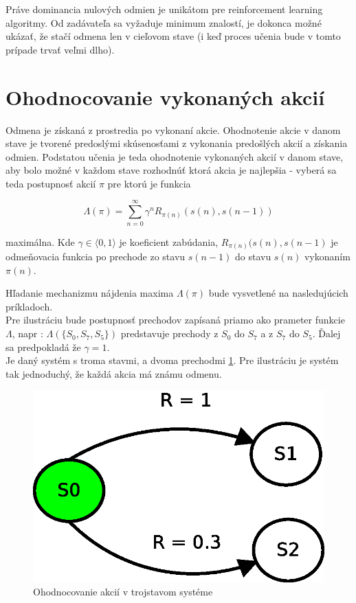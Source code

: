 Práve dominancia nulových odmien je unikátom pre reinforcement learning algoritmy.
Od zadávateľa sa vyžaduje minimum znalostí, je dokonca možné ukázať, že stačí
odmena len v cieľovom stave (i keď proces učenia bude v tomto prípade trvať veľmi dlho).


\section{Ohodnocovanie vykonaných akcií}

Odmena je získaná z prostredia po vykonaní akcie. Ohodnotenie akcie v danom stave
je tvorené predoslými skúsenosťami z vykonania predošlých akcií a získania odmien.
Podstatou učenia je teda ohodnotenie vykonaných akcií v danom stave, aby bolo
možné v každom stave rozhodnúť ktorá akcia je najlepšia - vyberá sa teda
postupnosť akcií $\pi$ pre ktorú je funkcia

\begin{equation}
\Lambda(\pi)  = \sum\limits_{n=0}^{\infty}\gamma^n R_{\pi(n)}(s(n), s(n-1))
\label{eq:q_quality}
\end{equation}

maximálna. Kde $\gamma \in \langle 0, 1 \rangle$ je koeficient zabúdania, $R_{\pi(n)}{(s(n), s(n-1)}$
je odmeňovacia funkcia po prechode zo stavu $s(n-1)$ do stavu $s(n)$ vykonaním $\pi(n)$.

Hľadanie mechanizmu nájdenia maxima $\Lambda(\pi)$ bude vysvetlené na nasledujúcich príkladoch.
\\
Pre ilustráciu bude postupnosť prechodov zapísaná priamo ako prameter funkcie $\Lambda$, napr :
$\Lambda(\{S_0, S_7, S_5\})$ predstavuje prechody z $S_0$ do $S_7$ a z $S_7$ do $S_5$.
Ďalej sa predpokladá že $\gamma = 1$.
\\
Je daný systém s troma stavmi, a dvoma prechodmi \ref{img:three_states_system}.
Pre ilustráciu je systém tak jednoduchý, že každá akcia má známu odmenu.

\begin{figure}[!htb]
\centering
\includegraphics[scale=.6]{../diagrams/rf_two_states.eps}
\caption{Ohodnocovanie akcií v trojstavom systéme}
\label{img:three_states_system}
\end{figure}

